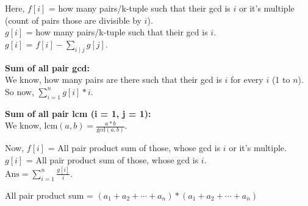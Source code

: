 {\small
Here, 
$f[i]$ = how many pairs/k-tuple such that their gcd is $i$ or it’s multiple (count of pairs those are divisible by $i$). \\ 
$g[i]$ = how many pairs/k-tuple such that their gcd is $i$. \\ 
$g[i]$ = $f[i] - \sum_{i \mid j} g[j]$. \\

\medskip

\textbf{Sum of all pair gcd:} \\

We know, how many pairs are there such that their gcd is $i$ for every $i$ (1 to $n$). So now,  
$\sum_{i=1}^{n} g[i] * i$. \\

\medskip

\textbf{Sum of all pair lcm (i = 1, j = 1):} \\
We know, 
$\text{lcm}(a, b) = \frac{a * b}{\text{gcd}(a,b)}$. \\
\medskip

Now, $f[i]$ = All pair product sum of those, whose gcd is $i$ or it’s multiple. \\ 
$g[i]$ = All pair product sum of those, whose gcd is $i$. \\

$\text{Ans} = \sum_{i=1}^{n} \frac{g[i]}{i}$. \\
\medskip

All pair product sum = $(a_1 + a_2 + \cdots + a_n) * (a_1 + a_2 + \cdots + a_n)$
}